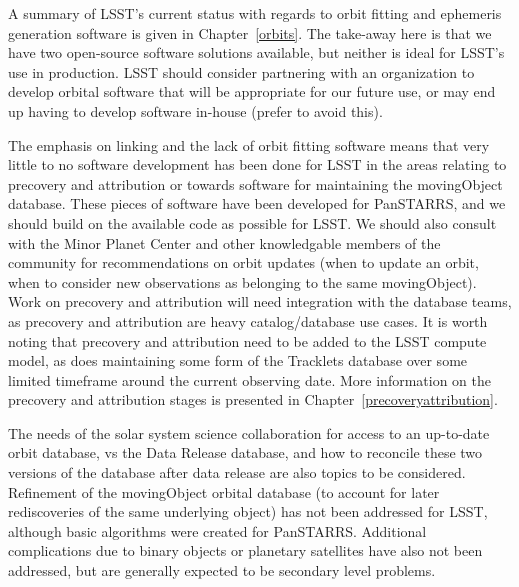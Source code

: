 A summary of LSST's current status with regards to orbit fitting and
ephemeris generation software is given in Chapter~\ref{orbits}. The
take-away here is that we have two open-source software solutions
available, but neither is ideal for LSST's use in production. LSST
should consider partnering with an organization to develop orbital
software that will be appropriate for our future use, or may end up
having to develop software in-house (prefer to avoid this). 

The emphasis on linking and the lack of orbit fitting software means
that very little to no software development has been done for
LSST in the areas relating to precovery and attribution or towards
software for maintaining the movingObject database.  These pieces of
software have been developed for PanSTARRS, and we should build on the
available code as possible for LSST. We should also consult with the
Minor Planet Center and other knowledgable members of the community
for recommendations on orbit updates (when to update an orbit, when to
consider new observations as belonging to the same movingObject). Work
on precovery and attribution will need integration with
the database teams, as precovery and attribution are heavy
catalog/database use cases. It is worth noting that precovery and
attribution need to be added to the LSST compute model, as does
maintaining some form of the Tracklets database over some limited
timeframe around the current observing date. More information on the
precovery and attribution stages is presented in
Chapter~\ref{precoveryattribution}. 

The needs of the solar system science collaboration for
access to an up-to-date orbit database, vs the Data Release database,
and how to reconcile these two versions of the database after data
release are also topics to be considered.  Refinement of the
movingObject orbital database (to account for later rediscoveries of
the same underlying object) has not been addressed for LSST, although
basic algorithms were created for PanSTARRS.  Additional complications
due to binary objects or planetary satellites have also not been
addressed, but are generally expected to be secondary level problems. 